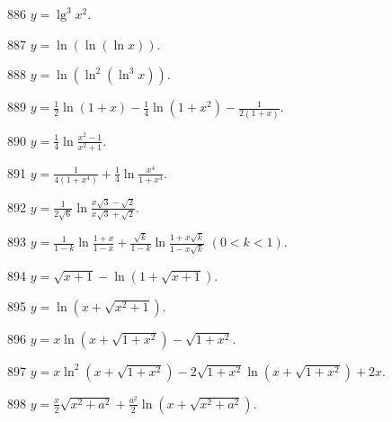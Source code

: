\begin{prob}[S]{886}
$y = \lg^3 x^2$.
\end{prob}

\begin{prob}[S]{887}
$y = \ln(\ln(\ln x))$.
\end{prob}

\begin{prob}[S]{888}
$y = \ln(\ln^2(\ln^3 x))$.
\end{prob}

\begin{prob}[S]{889}
$y = \frac{1}{2}\ln(1 + x) - \frac{1}{4}\ln(1 + x^2) - \frac{1}{2(1 + x)}$.
\end{prob}

\begin{prob}[S]{890}
$y = \frac{1}{4}\ln\frac{x^2 - 1}{x^2 + 1}$.
\end{prob}

\begin{prob}[S]{891}
$y = \frac{1}{4(1 + x^4)} + \frac{1}{4}\ln\frac{x^4}{1 + x^4}$.
\end{prob}

\begin{prob}[S]{892}
$y = \frac{1}{2\sqrt{6}}\ln\frac{x\sqrt{3} - \sqrt{2}}{x\sqrt{3} + \sqrt{2}}$.
\end{prob}

\begin{prob}[S]{893}
$y = \frac{1}{1 - k}\ln\frac{1 + x}{1 - x} + \frac{\sqrt{k}}{1 - k}\ln\frac{1 + x\sqrt{k}}{1 - x\sqrt{k}}$ $(0 < k < 1)$.
\end{prob}

\begin{prob}[S]{894}
$y = \sqrt{x + 1} - \ln(1 + \sqrt{x + 1})$.
\end{prob}

\begin{prob}[S]{895}
$y = \ln(x + \sqrt{x^2 + 1})$.
\end{prob}

\begin{prob}[S]{896}
$y = x\ln(x + \sqrt{1 + x^2}) - \sqrt{1 + x^2}$.
\end{prob}

\begin{prob}[S]{897}
$y = x\ln^2(x + \sqrt{1 + x^2}) - 2\sqrt{1 + x^2}\ln(x + \sqrt{1 + x^2}) + 2x$.
\end{prob}

\begin{prob}[S]{898}
$y = \frac{x}{2}\sqrt{x^2 + a^2} + \frac{a^2}{2}\ln(x + \sqrt{x^2 + a^2})$.
\end{prob}


